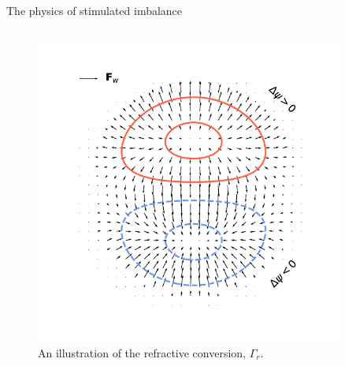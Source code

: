 \documentclass[final]{beamer}
\begin{document}
\begin{frame}[t]
\begin{columns}[t]
\begin{column}{0.4\paperwidth}
\begin{alertblock}{The physics of stimulated imbalance}
                \begin{columns}
                  \begin{column}{.425\textwidth}
                  \begin{figure}
                    \includegraphics[width=0.9\textwidth]{figs/Gammar.pdf}
                    \caption{An illustration of the refractive conversion,
                              $\Gamma_r$.}
                  \end{figure}
                \end{column}


\end{columns}
\end{alertblock}
\end{column}
\end{columns}
\end{frame}
\end{document}
